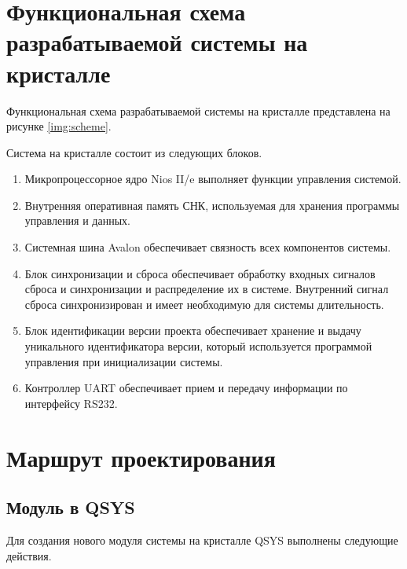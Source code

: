 \chapter*{Функциональная схема разрабатываемой системы на кристалле}

Функциональная схема разрабатываемой системы на кристалле представлена на рисунке \ref{img:scheme}.


Система на кристалле состоит из следующих блоков.

\begin{enumerate}
\item Микропроцессорное ядро Nios II/e выполняет функции управления системой.
\item Внутренняя оперативная память СНК, используемая для хранения программы
управления и данных.
\item Системная шина Avalon обеспечивает связность всех компонентов системы.
\item Блок синхронизации и сброса обеспечивает обработку входных сигналов сброса и
синхронизации и распределение их в системе. Внутренний сигнал сброса
синхронизирован и имеет необходимую для системы длительность.
\item Блок идентификации версии проекта обеспечивает хранение и выдачу уникального
идентификатора версии, который используется программой управления при
инициализации системы.
\item Контроллер UART обеспечивает прием и передачу информации по интерфейсу RS232.
\end{enumerate}

\clearpage

\chapter*{Маршрут проектирования}

\section*{Модуль в QSYS}

Для создания нового модуля системы на кристалле QSYS выполнены следующие действия.


